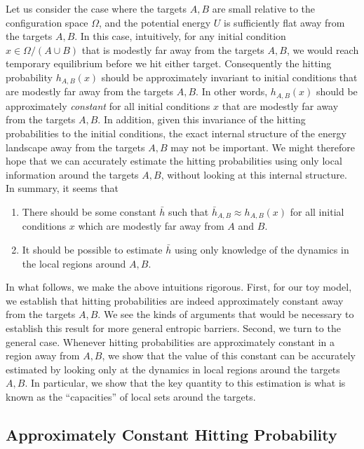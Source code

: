 \documentclass[english, aip, jcp, priprint, graphicx,floatfix]{revtex4-1}
\theoremstyle{plain}
\theoremstyle{definition}
\theoremstyle{plain}
\begin{document}
Let us consider the case where the targets $A, B$ are small relative to the configuration space $\Omega$, and the potential energy $U$ is sufficiently flat away from the targets $A, B$.  In this case, intuitively, for any initial condition $x\in \Omega / (A\cup B)$ that is modestly far away from the targets $A, B$, we would reach temporary equilibrium before we hit either target.  Consequently the hitting probability $h_{A, B}(x)$ should be approximately invariant to initial conditions that are modestly far away from the targets $A, B$.  In other words, $h_{A,B}(x)$ should be approximately \emph{constant} for all initial conditions $x$ that are modestly far away from the targets $A, B$.  In addition, given this invariance of the hitting probabilities to the initial conditions, the exact internal structure of the energy landscape away from the targets $A, B$ may not be important.  We might therefore hope that we can accurately estimate the hitting probabilities using only local information around the targets $A, B$, without looking at this internal structure. In summary, it seems that
%
\begin{enumerate}
    \item There should be some constant $\bar h$ such that $\bar h_{A,B} \approx h_{A,B}(x)$ for all initial conditions $x$ which are modestly far away from $A$ and $B$.
    \item It should be possible to estimate $\bar h$ using only knowledge of the dynamics in the local regions around $A,B$.  
\end{enumerate}
%
In what follows, we make the above intuitions rigorous.  First, for our toy model, we establish that hitting probabilities are indeed approximately constant away from the targets $A,B$.  We see the kinds of arguments that would be necessary to establish this result for more general entropic barriers.  Second, we turn to the general case.   Whenever hitting probabilities are approximately constant in a region away from $A,B$, we show that the value of this constant can be accurately estimated by looking only at the dynamics in local regions around the targets $A,B$.  In particular, we show that the key quantity to this estimation is what is known as the ``capacities'' of local sets around the targets. 

\subsection{Approximately Constant Hitting Probability}
\end{document}
